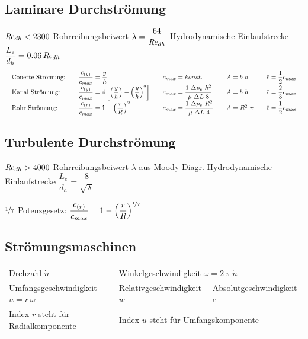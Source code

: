 \subsection{Laminare Durchströmung}
	$ \operatorname{\mathit{R\kern-.10em e}}_{dh} < 2300 $ \quad	Rohrreibungsbeiwert $ \lambda = \dfrac{64}{\operatorname{\mathit{R\kern-.10em e}}_{dh}} $ \qquad	Hydrodynamische Einlaufstrecke $ \dfrac{L_e}{d_h} = \num{0,06} \operatorname{\mathit{R\kern-.10em e}}_{dh}  $
	\setlength{\abovedisplayskip}{5pt}
	\[ \arraycolsep=1em
	\begin{array}{lllll}
		\text{Couette Strömung:} & \dfrac{c_{(y)}}{c_{max}} = \dfrac{y}{h}                                                            & c_{max} = konst.                                       & A = b\ h     & \overline{c} = \dfrac{1}{2} c_{max} \\
		\text{Kanal Strömung:}   & \dfrac{c_{(y)}}{c_{max}} = 4 \left[\left(\dfrac{y}{h}\right) - \left(\dfrac{y}{h}\right)^2 \right] & c_{max} = \dfrac{1\ \Delta p_v\ h^2}{\mu\ \Delta L\ 8} & A = b\ h     & \overline{c} = \dfrac{2}{3} c_{max} \\
		\text{Rohr Strömung:}    & \dfrac{c_{(r)}}{c_{max}} = 1 - \left(\dfrac{r}{R}\right)^2                                         & c_{max} = \dfrac{1\ \Delta p_v\ R^2}{\mu\ \Delta L\ 4} & A = R^2\ \pi & \overline{c} = \dfrac{1}{2} c_{max}
	\end{array} 
	\]
\subsection{Turbulente Durchströmung}
	$ \operatorname{\mathit{R\kern-.10em e}}_{dh} > 4000 $ \quad	Rohrreibungsbeiwert $ \lambda $ aus Moody Diagr. \qquad	Hydrodynamische Einlaufstrecke $ \dfrac{L_e}{d_h} = \dfrac{8}{\sqrt{\lambda}}  $
	
	$ \nicefrac{1}{7} $ Potenzgesetz: $ \dfrac{c_{(r)}}{c_{max}} = 1 - \left(\dfrac{r}{R}\right)^{\nicefrac{1}{7}} $
	
\subsection{Strömungsmaschinen}
%
	\begin{center}
		\setlength{\tabcolsep}{1.3em} %
		\begin{tabular}{lll}
			Drehzahl $ \dot{n} $                     & \multicolumn{2}{l}{Winkelgeschwindigkeit $ \omega = 2\ \pi\ \dot{n} $}                              \\
			Umfangsgeschwindigkeit $ u = r\ \omega $ & Relativgeschwindigkeit $ w $                       & Absolutgeschwindigkeit $ c $ \\
			Index $ r $ steht für Radialkomponente   & \multicolumn{2}{l}{Index $ u $ steht für Umfangskomponente}            
		\end{tabular}
	\end{center}

